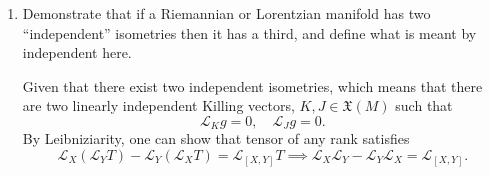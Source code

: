\begin{enumerate}[label=\roman*)]
\begin{solution}
        Now consider $Q\in\Lambda^1(M)$ and $Z\in\mathfrak{X}(M)$,
        \begin{equation}
            \mathcal{L}_X(\mathcal{L}_Y Q(Z)) - \mathcal{L}_Y(\mathcal{L}_X Q(Z)).
        \end{equation}
        Since $Q(Z)\in C^\infty(M)$, we have
        \begin{equation}
            \mathcal{L}_X(\mathcal{L}_Y Q(Z)) - \mathcal{L}_Y(\mathcal{L}_X Q(Z))  =\mathcal{L}_{[X,Y]}Q(Z).
        \end{equation}
        Now, using Leibniz property of the Lie derivative, we have
        \begin{equation}
        \begin{aligned}
            &\mathcal{L}_X((\mathcal{L}_Y Q)(Z)+Q(\mathcal{L}_YZ)) - \mathcal{L}_Y((\mathcal{L}_X Q)(Z)+Q(\mathcal{L}_XZ))\\
            =&\mathcal{L}_X(\mathcal{L}_YQ)Z + Q(\mathcal{L}_X(\mathcal{L}_YZ)) - \mathcal{L}_Y(\mathcal{L}_XQ)Z + Q(\mathcal{L}_Y(\mathcal{L}_XZ)),
        \end{aligned}
        \end{equation}
        which should be equal to 
        \begin{equation}
            \mathcal{L}_{[X,Y]}Q(Z).
        \end{equation}
        Therefore, $Q \in \Lambda^1(M)$ must also satisfy 
        \begin{equation}
            \mathcal{L}_X(\mathcal{L}_Y Q) - \mathcal{L}_Y(\mathcal{L}_X Q) = \mathcal{L}_{[X,Y]}Q.
        \end{equation}
    \end{solution}
    \item Demonstrate that if a Riemannian or Lorentzian manifold has two ``independent'' isometries then it has a third, and define what is meant by independent here.
    \begin{solution}
        Given that there exist two independent isometries, which means that there are two linearly independent Killing vectors, $K,J\in\mathfrak{X}(M)$ such that
        \begin{equation}
            \mathcal{L}_Kg=0, \quad \mathcal{L}_Jg=0.
        \end{equation}
        By Leibniziarity, one can show that tensor of any rank satisfies
        \begin{equation}
            \mathcal{L}_X(\mathcal{L}_Y T) - \mathcal{L}_Y(\mathcal{L}_X T) = \mathcal{L}_{[X,Y]}T \implies \mathcal{L}_X \mathcal{L}_Y -  \mathcal{L}_Y\mathcal{L}_X = \mathcal{L}_{[X,Y]}.

\end{equation}
\end{solution}
\end{enumerate}
